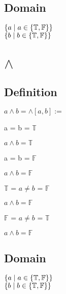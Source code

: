 \documentclass[11pt]{article}
\begin{document}
\subsection{Domain}
\begin{center}
$
\{a \hspace{1mm} | \hspace{1mm} a \in \{\mathbb{T},\mathbb{F}\}\}
$
\\ \vspace{2mm}
$
\{b \hspace{1mm} | \hspace{1mm} b \in \{\mathbb{T},\mathbb{F}\}\}
$
\end{center}








\section{$\land$}
\subsection{Definition}
\begin{center}
$
a \land b = \land[a,b] :=
$
\end{center}
\vspace{2mm}
a = b = $\mathbb{T}$
\begin{center}
$
a \land b = \mathbb{T}
$
\end{center}
\vspace{2mm}
a = b = $\mathbb{F}$
\begin{center}
$
a \land b  = \mathbb{F}
$
\end{center}
\vspace{2mm}
$\mathbb{T}$ = $a \neq b$ = $\mathbb{F}$
\begin{center}
$
a \land b = \mathbb{F}
$
\end{center}
\vspace{2mm}
$\mathbb{F}$ = $a \neq b$ = $\mathbb{T}$
\begin{center}
$
a \land b = \mathbb{F}
$
\end{center}
\subsection{Domain}
\begin{center}
$
\{a \hspace{1mm} | \hspace{1mm} a \in \{\mathbb{T},\mathbb{F}\}\}
$
\\ \vspace{2mm}
$
\{b \hspace{1mm} | \hspace{1mm} b \in \{\mathbb{T},\mathbb{F}\}\}
$
\end{center}
\end{document}
